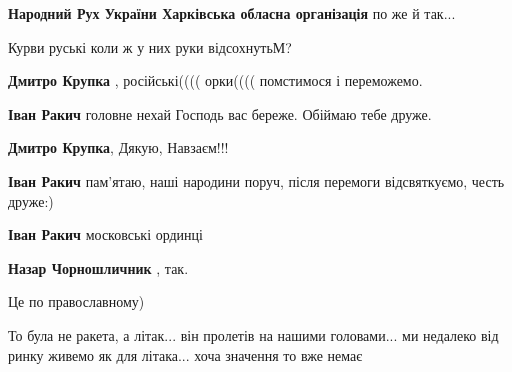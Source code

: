 \begin{itemize}
\begin{itemize}
\textbf{Народний Рух України Харківська обласна організація} по же й так...
\end{itemize} %

Курви руські коли ж у них руки відсохнутьМ?

\begin{itemize} %
\textbf{Дмитро Крупка} , російські(((( орки(((( помстимося і переможемо.

\textbf{Іван Ракич} головне нехай Господь вас береже. Обіймаю тебе друже.

\textbf{Дмитро Крупка}, Дякую, Навзаєм!!!

\textbf{Іван Ракич} пам'ятаю, наші народини поруч, після перемоги відсвяткуємо, честь друже:)

\textbf{Іван Ракич} московські ординці

\textbf{Назар Чорношличник} , так.
\end{itemize} %

Це по православному)


То була не ракета, а літак... він пролетів на нашими головами... ми недалеко від
ринку живемо як для літака... хоча значення то вже немає

\end{itemize} %
